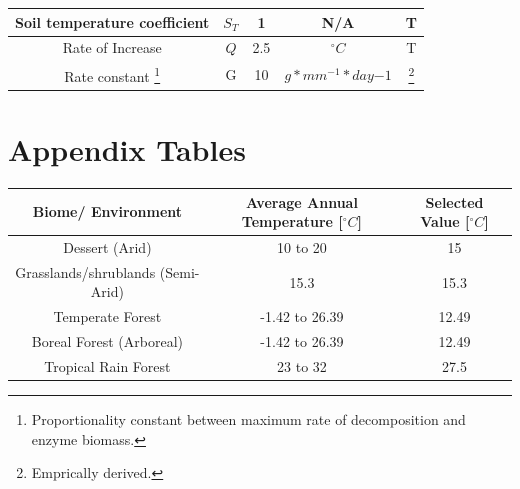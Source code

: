 \documentclass[12pt]{article}
\begin{document}
\begin{savenotes}
\begin{table}[ht]
\begin{center}
\begin{tabular}{|c c c c c|}
				\hline
				Soil temperature coefficient & $S_T$ & 1 & N/A &\cite{Moorhead1991} T\\
				\hline
				Rate of Increase & $Q$ & 2.5 & $^{\circ}C$ &\cite{Moorhead1991} T\\
				\hline
				Rate constant \footnote{Proportionality constant between maximum rate of decomposition and enzyme biomass.} & G & 10 & $g*mm^{-1}*day{-1}$ &\cite{Lustenhouwer2020}\footnote{Emprically derived.}\\  %
				\hline
			\end{tabular}
		\vspace*{-3ex}
		\label{table3}
		\end{center}
	\end{table}
\end{savenotes}


\section{Appendix Tables}

\begin{table}[H]
	\begin{center}
		\begin{tabular}{|c c c|} 
			\hline
			Biome/ Environment & Average Annual Temperature [$^{\circ}C$] & Selected Value [$^{\circ}C$]\\ [0.5ex] 
			\hline\hline
			Dessert (Arid) & 10 to 20 \cite{Davey2007} & 15 \\ 
			\hline
			Grasslands/shrublands (Semi-Arid) & 15.3 \cite{Pelaez1994} & 15.3 \\
			\hline
			Temperate Forest & -1.42 to 26.39 \cite{Zaz2019} & 12.49 \\
			\hline
			Boreal Forest (Arboreal)& -1.42 to 26.39 \cite{Zaz2019} & 12.49 \\
			\hline
			Tropical Rain Forest & 23 to 32 \cite{Paton2019} &27.5 \\
			\hline
		\end{tabular}
	\vspace*{-3ex}
	\label{table6}
	\end{center}
\end{table}
\end{document}
